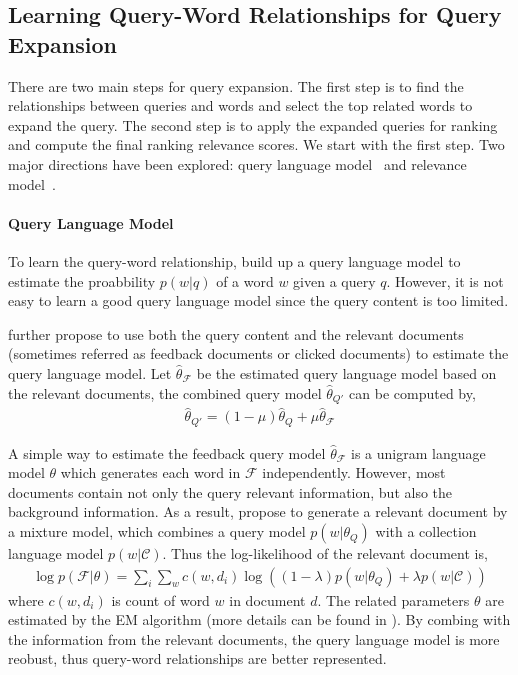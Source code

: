 \subsection{Learning Query-Word Relationships for Query Expansion}

There are two main steps for query expansion. The first step is to find the relationships between queries and words and select the top related words to expand the query. The second step is to apply the expanded queries for ranking and compute the final ranking relevance scores. We start with the first step. Two major directions have been explored: query language model~\citep{zhai-01b} and relevance model~\citep{Lavrenko-2001}.

\paragraph{Query Language Model}

To learn the query-word relationship, \cite{zhai-01b} build up a query language model to estimate the proabbility $p(w|q)$ of a word $w$ given a query $q$. However, it is not easy to learn a good query language model since the query content is too limited.

\cite{zhai-01b} further propose to use both the query content and the relevant documents (sometimes referred as feedback documents or clicked documents) to estimate the query language model. Let $\hat{\theta}_{\mathcal{F}}$ be the estimated query language model based on the relevant documents, the combined query model $\hat{\theta}_{Q'}$ can be computed by,
\begin{align}
\hat{\theta}_{Q'} = (1 - \mu)\hat{\theta}_{Q} + \mu \hat{\theta}_{\mathcal{F}}
\end{align}

A simple way to estimate the feedback query model $\hat{\theta}_{\mathcal{F}}$ is a unigram language model $\theta$ which generates each word in $\mathcal{F}$ independently. However, most documents contain not only the query relevant information, but also the background information. As a result, \cite{zhai-01b} propose to generate a relevant document by a mixture model, which combines a query model $p(w|\theta_Q)$ with a collection language model $p(w|\mathcal{C})$. Thus the log-likelihood of the relevant document is,
\begin{align}
\log p(\mathcal{F}|\theta) = \sum_i \sum_w c(w, d_i) \log((1-\lambda)p(w|\theta_Q) + \lambda p(w|\mathcal{C}))
\end{align}
where $c(w, d_i)$ is count of word $w$ in document $d$. The related parameters $\theta$ are estimated by the EM algorithm (more details can be found in \cite{zhai-01b}). By combing with the information from the relevant documents, the query language model is more reobust, thus query-word relationships are better represented.

